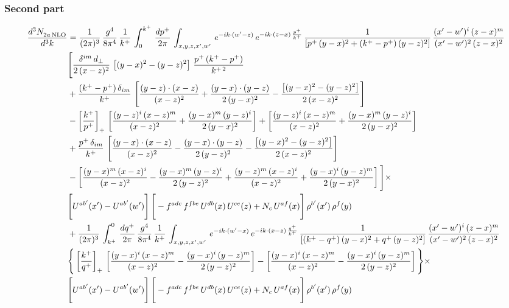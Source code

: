 \documentclass[9pt]{article}
\numberwithin{equation}{section}
\begin{document}
\subsubsection*{Second part}
\begin{align}
    \frac{d^{3}N_{2a\,\rm NLO}^{\rm}}{d^{3}k}  & =  \frac{1}{(2\pi)^{3}}\, \frac{g^{4}}{8\pi^{4}}\,\frac{1}{k^{+}}\,\int_{0}^{k^{+}}\, \frac{dp^{+}}{2\pi}\,\int_{x,y,z,x',w'}\,e^{-ik\cdot(w'-z)}\,e^{-ik\cdot (z-x)\,\frac{p^{+}}{k^{+}}}\,\frac{1}{\left[p^{+}\,(y-x)^{2}+(k^{+}-p^{+})\,(y-z)^{2}\right]}\, \frac{(x'-w')^{i}\,(z-x)^{m}}{(x'-w')^{2}\,(z-x)^{2}} \notag \\ & \Bigg[\frac{\delta^{im}\,d_{\perp}}{2\,(x-z)^{2}}\,\left[(y-x)^{2}-(y-z)^{2}\right]\,\frac{p^{+}\,(k^{+}-p^{+})}{k^{+\,2}}\notag \\ & +\frac{(k^{+}-p^{+})\,\delta_{im}}{k^{+}}\,\left[\frac{(y-z)\cdot (x-z)}{(x-z)^{2}}+\frac{(y-x)\cdot (y-z)}{2\,(y-x)^{2}}-\frac{\left[(y-x)^{2}-(y-z)^{2}\right]}{2\,(x-z)^{2}}\right]\notag \\ & -\left[\frac{k^{+}}{p^{+}}\right]_{+}\,\left[\frac{(y-z)^{i}\,(x-z)^{m}}{(x-z)^{2}}+\frac{(y-x)^{m}\,(y-z)^{i}}{2\,(y-x)^{2}}\right]+ \left[\frac{(y-z)^{i}\,(x-z)^{m}}{(x-z)^{2}}+\frac{(y-x)^{m}\,(y-z)^{i}}{2\,(y-x)^{2}}\right]\notag \\ & +\frac{p^{+}\,\delta_{im}}{k^{+}}\,\left[\frac{(y-x)\cdot (x-z)}{(x-z)^{2}}-\frac{(y-x)\cdot (y-z)}{2\,(y-z)^{2}}-\frac{\left[(y-x)^{2}-(y-z)^{2}\right]}{2\,(x-z)^{2}}\right]\notag \\ &-\left[\frac{(y-x)^{m}\,(x-z)^{i}}{(x-z)^{2}}-\frac{(y-x)^{m}\,(y-z)^{i}}{2\,(y-z)^{2}}+\frac{(y-z)^{m}\,(x-z)^{i}}{(x-z)^{2}}+\frac{(y-x)^{i}\,(y-z)^{m}}{2\,(y-x)^{2}}\right]\Bigg]\times \notag \\ & \Bigg[U^{ab'}(x')-U^{ab'}(w')\Bigg]\,\Bigg[-f^{adc}\,f^{fbe}\,U^{db}(x)\,U^{ce}(z)+N_{c}\,U^{af}(x)\Bigg]\,\rho^{b'}(x')\,\rho^{f}(y)\notag \\ & + \frac{1}{(2\pi)^{3}}\,\int^{0}_{k^{+}}\, \frac{dq^{+}}{2\pi} \,\frac{g^{4}}{8\pi^{4}}\,\frac{1}{k^{+}}\, \int_{x,y,z,x',w'}\,e^{-ik\cdot(w'-x)}\,e^{-ik\cdot (x-z)\,\frac{q^{+}}{k^{+}}}\, \frac{1}{\left[(k^{+}-q^{+})\,(y-x)^{2}+q^{+}\,(y-z)^{2}\right]}\, \frac{(x'-w')^{i}\,(z-x)^{m}}{(x'-w')^{2}\,(z-x)^{2}} \notag \\ &\Bigg\{\left[\frac{k^{+}}{q^{+}}\right]_{+}\,\left[\frac{(y-x)^{i}\,(x-z)^{m}}{(x-z)^{2}}-\frac{(y-x)^{i}\,(y-z)^{m}}{2\,(y-z)^{2}}\right] -\left[\frac{(y-x)^{i}\,(x-z)^{m}}{(x-z)^{2}}-\frac{(y-x)^{i}\,(y-z)^{m}}{2\,(y-z)^{2}}\right]\Bigg\}\times\,\notag \\ & \Bigg[U^{ab'}(x')-U^{ab'}(w')\Bigg]\,\Bigg[-f^{adc}\,f^{fbe}\,U^{db}(x)\,U^{ce}(z)+N_{c}\,U^{af}(x)\Bigg]\,\rho^{b'}(x')\,\rho^{f}(y)
\end{align}
\end{document}
